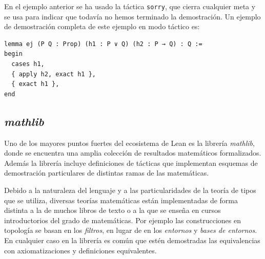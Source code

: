 En el ejemplo anterior se ha usado la táctica \lstinline{sorry}, que cierra
cualquier meta y se usa para indicar que todavía no hemos terminado la
demostración. Un ejemplo de demostración completa de este ejemplo en modo
táctico es:

\begin{lstlisting}
lemma ej (P Q : Prop) (h1 : P ∨ Q) (h2 : P → Q) : Q :=
begin
  cases h1,
  { apply h2, exact h1 },
  { exact h1 },
end
\end{lstlisting}

\subsection{\textit{mathlib}}

Uno de los mayores puntos fuertes del ecosistema de Lean es la librería
\textit{mathlib}, donde se encuentra una amplia colección de resultados
matemáticos formalizados. Además la librería incluye definiciones de tácticas
que implementan esquemas de demostración particulares de distintas ramas de las
matemáticas.

Debido a la naturaleza del lenguaje y a las particularidades de la teoría de
tipos que se utiliza, diversas teorías matemáticas están implementadas de forma
distinta a la de muchos libros de texto o a la que se enseña en cursos introductorios
del grado de matemáticas. Por ejemplo las construcciones en topología se
basan en los \textit{filtros}, en lugar de en los \textit{entornos} y
\textit{bases de entornos}. En cualquier caso en la librería es común que estén
demostradas las equivalencias con axiomatizaciones y definiciones equivalentes.










